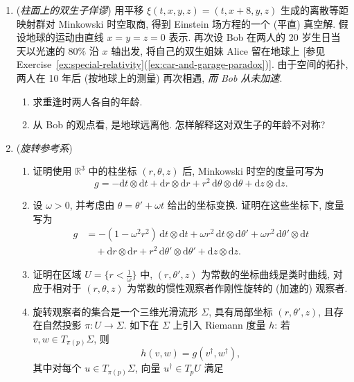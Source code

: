 \begin{RiemannExercise}
\begin{enumerate}[label=(\arabic*),ref=\arabic*,leftmargin=*]
\begin{enumerate}[label=(\alph*),leftmargin=*]
(\textbf{注}: 可以证明, 自旋粒子的角动量向量沿其运动作 Fermi–Walker 移动, 且与其运动正交; 上述进动已在电子等自旋粒子上观测到, 称为 \textbf{Thomas 进动}.)
\end{enumerate}
\item\label{ex:twin-paradox-on-cylinder}
(\emph{柱面上的双生子佯谬}) 用平移 $\xi(t,x,y,z)=(t,x+8,y,z)$ 生成的离散等距映射群对 Minkowski 时空取商, 得到 Einstein 场方程的一个 (平直) 真空解. 假设地球的运动由直线 $x=y=z=0$ 表示. 再次设 Bob 在两人的 20 岁生日当天以光速的 $80\%$ 沿 $x$ 轴出发, 将自己的双生姐妹 Alice 留在地球上 [参见 Exercise~\ref{ex:special-relativity}(\ref{ex:car-and-garage-paradox})]. 由于空间的拓扑, 两人在 10 年后 (按地球上的测量) 再次相遇, \emph{而 Bob 从未加速}.
\begin{enumerate}[label=(\alph*),leftmargin=*]
\item 求重逢时两人各自的年龄.
\item 从 Bob 的观点看, 是地球远离他. 怎样解释这对双生子的年龄不对称?
\end{enumerate}
\item\label{ex:rotating-frame-in-minkowski-spacetime}
(\emph{旋转参考系})
\begin{enumerate}[label=(\alph*),leftmargin=*]
\item 证明使用 $\mathbb{R}^3$ 中的柱坐标 $(r,\theta,z)$ 后, Minkowski 时空的度量可写为
\[
  g=-\mathrm{d}t\otimes\mathrm{d}t+\mathrm{d}r\otimes\mathrm{d}r
     +r^2\,\mathrm{d}\theta\otimes\mathrm{d}\theta+\mathrm{d}z\otimes\mathrm{d}z.
\]
\item 设 $\omega>0$, 并考虑由 $\theta=\theta'+\omega t$ 给出的坐标变换. 证明在这些坐标下, 度量写为
\begin{align*}
  g&=-(1-\omega^2r^2)\,\mathrm{d}t\otimes\mathrm{d}t
    +\omega r^2\,\mathrm{d}t\otimes\mathrm{d}\theta'
    +\omega r^2\,\mathrm{d}\theta'\otimes\mathrm{d}t\\
   &\quad+\mathrm{d}r\otimes\mathrm{d}r
    +r^2\,\mathrm{d}\theta'\otimes\mathrm{d}\theta'+\mathrm{d}z\otimes\mathrm{d}z.
\end{align*}
\item 证明在区域 $U=\{r<\frac{1}{\omega}\}$ 中, $(r,\theta',z)$ 为常数的坐标曲线是类时曲线, 对应于相对于 $(r,\theta,z)$ 为常数的惯性观察者作刚性旋转的 (加速的) 观察者.
\item 旋转观察者的集合是一个三维光滑流形 $\Sigma$, 具有局部坐标 $(r,\theta',z)$, 且存在自然投影 $\pi:U\to\Sigma$. 如下在 $\Sigma$ 上引入 Riemann 度量 $h$: 若 $v,w\in T_{\pi(p)}\Sigma$, 则
\[
  h(v,w)=g(v^\dagger,w^\dagger),
\]
其中对每个 $u\in T_{\pi(p)}\Sigma$, 向量 $u^\dagger\in T_pU$ 满足

\end{enumerate}
\end{enumerate}
\end{RiemannExercise}
